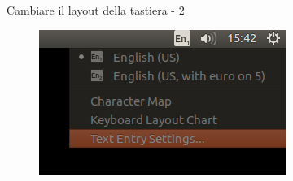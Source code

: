 \begin{frame}{Cambiare il layout della tastiera - 2}

\begin{figure}
\centering
\includegraphics[scale=0.9]{res/img/2}
\end{figure}

\end{frame}